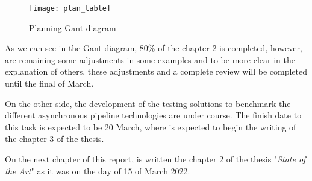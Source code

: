 \begin{figure}[ht]
	\texttt{[image: plan\_table]}
	  \caption{Planning Gant diagram}
  \label{fig:pla}
\end{figure}

As we can see in the Gant diagram, 80\% of the chapter 2 is completed, however, are remaining some adjustments in some examples and to be more clear in the explanation of others, these adjustments and a complete review will be completed until the final of March.

On the other side, the development of the testing solutions to benchmark the different asynchronous pipeline technologies are under course. The finish date to this task is expected to be 20 March, where is expected to begin the writing of the chapter 3 of the thesis.

On the next chapter of this report, is written the chapter 2 of the thesis "\textit{State of the Art}" as it was on the day of 15 of March 2022.

